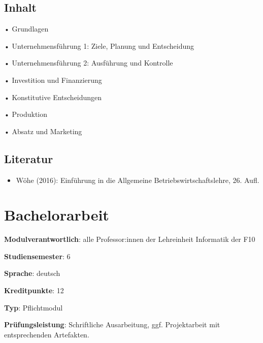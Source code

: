 \hypertarget{inhaltpathlabelmi-2017modulbeschreibungen-bachelorba_bwl1}{%
\section*{Inhalt\label{/mi-2017/modulbeschreibungen-bachelor/BA_BWL1}}\label{inhaltpathlabelmi-2017modulbeschreibungen-bachelorba_bwl1}}

• Grundlagen

• Unternehmensführung 1: Ziele, Planung und Entscheidung

• Unternehmensführung 2: Ausführung und Kontrolle

• Investition und Finanzierung

• Konstitutive Entscheidungen

• Produktion

• Absatz und Marketing

\hypertarget{literaturpathlabelmi-2017modulbeschreibungen-bachelorba_bwl1}{%
\section*{Literatur\label{/mi-2017/modulbeschreibungen-bachelor/BA_BWL1}}\label{literaturpathlabelmi-2017modulbeschreibungen-bachelorba_bwl1}}

\begin{itemize}
\tightlist
\item
  Wöhe (2016): Einführung in die Allgemeine Betriebswirtschaftslehre,
  26. Aufl.
\end{itemize}

\hypertarget{bachelorarbeitpathlabelmi-2017modulbeschreibungen-bachelorba_bachelorarbeit}{%
\chapter{Bachelorarbeit\label{/mi-2017/modulbeschreibungen-bachelor/BA_Bachelorarbeit}}\label{bachelorarbeitpathlabelmi-2017modulbeschreibungen-bachelorba_bachelorarbeit}}

\begin{modulHead}
\textbf{Modulverantwortlich}: alle Professor:innen
der Lehreinheit Informatik der
F10
\end{modulHead}
\begin{modulHead}
\textbf{Studiensemester}:
6
\end{modulHead}
\begin{modulHead}
\textbf{Sprache}:
deutsch
\end{modulHead}
\begin{modulHead}
\textbf{Kreditpunkte}:
12
\end{modulHead}
\begin{modulHead}
\textbf{Typ}:
Pflichtmodul
\end{modulHead}
\begin{modulHead}
\textbf{Prüfungsleistung}:
Schriftliche Ausarbeitung, ggf. Projektarbeit mit entsprechenden
Artefakten.
\end{modulHead}


